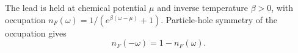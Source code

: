 \documentclass{article}
\begin{document}
The lead is held at chemical potential $\mu$ and inverse temperature $\beta>0$, with occupation
$n_F(\omega) = 1/(e^{\beta(\omega-\mu)}+1)$. Particle-hole symmetry of the occupation gives
\begin{equation}
n_F(-\omega) = 1 - n_F(\omega) .
\label{eq:ph}
\end{equation}
\end{document}
